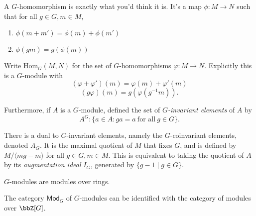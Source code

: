 \documentclass[a4paper, 12pt,oneside,openany]{book}
\begin{document}

A $G$-homomorphism is exactly what you'd think it is. It's a map $\phi: M\to N$ such that for all $g \in G, m \in M$, \begin{enumerate}
	\item $\phi(m+m') = \phi(m)+\phi(m')$
	\item $\phi(gm) = g(\phi(m))$
\end{enumerate}

Write $\text{Hom}_G(M, N)$ for the set of $G$-homomorphisms $\varphi:M\to N$. Explicitly this is a $G$-module with $$(\varphi+\varphi')(m) = \varphi(m)+\varphi'(m)$$ $$(g\varphi)(m) = g(\varphi(g^{-1}m)).$$

Furthermore, if $A$ is a $G$-module, defined the set of \emph{$G$-invariant elements} of $A$ by $$A^G: \{a \in A: ga =a\ \text{for all}\ g\in G\}.$$

There is a dual to $G$-invariant elements, namely the $G$-coinvariant elements, denoted $A_G$. It is the maximal quotient of $M$ that fixes $G$, and is defined by $M/ \langle mg-m \rangle$ for all $g\in G, m \in M$. This is equivalent to taking the quotient of $A$ by its \emph{augmentation ideal} $I_G$, generated by $\{g-1 \mid g\in G\}$. 

$G$-modules are modules over rings. 


The category $\textsf{Mod}_G$ of $G$-modules can be identified with the category of modules over $\bbZ[G]$.

\end{document}
